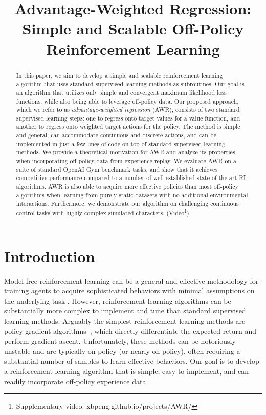 \title{Advantage-Weighted Regression: Simple and Scalable Off-Policy Reinforcement Learning}

\begin{abstract}
In this paper, we aim to develop a simple and scalable reinforcement learning algorithm that uses standard supervised learning methods as subroutines. Our goal is an algorithm that utilizes only simple and convergent maximum likelihood loss functions, while also being able to leverage off-policy data. Our proposed approach, which we refer to as \textit{advantage-weighted regression} (AWR), consists of two standard supervised learning steps: one to regress onto target values for a value function, and another to regress onto weighted target actions for the policy. The method is simple and general, can accommodate continuous and discrete actions, and can be implemented in just a few lines of code on top of standard supervised learning methods. We provide a theoretical motivation for AWR and analyze its properties when incorporating off-policy data from experience replay. We evaluate AWR on a suite of standard OpenAI Gym benchmark tasks, and show that it achieves competitive performance compared to a number of well-established state-of-the-art RL algorithms. AWR is also able to acquire more effective policies than most off-policy algorithms when learning from purely static datasets with no additional environmental interactions. Furthermore, we demonstrate our algorithm on challenging continuous control tasks with highly complex simulated characters. (\href{https://xbpeng.github.io/projects/AWR/}{Video\footnote{\label{ft:website}Supplementary video: \href{https://xbpeng.github.io/projects/AWR/}{xbpeng.github.io/projects/AWR/}}})
\end{abstract}

\section{Introduction}
Model-free reinforcement learning can be a general and effective methodology for training agents to acquire sophisticated behaviors with minimal assumptions on the underlying task \citep{mnih2015humanlevel,HeessTSLMWTEWER17,Pathak2017}. However, reinforcement learning algorithms can be substantially more complex to implement and tune than standard supervised learning methods. Arguably the simplest reinforcement learning methods are policy gradient algorithms~\citep{PoliGrad1999}, which directly differentiate the expected return and perform gradient ascent. Unfortunately, these methods can be notoriously unstable and are typically on-policy (or nearly on-policy), often requiring a substantial number of samples to learn effective behaviors. Our goal is to develop a reinforcement learning algorithm that is simple, easy to implement, and can readily incorporate off-policy experience data.

